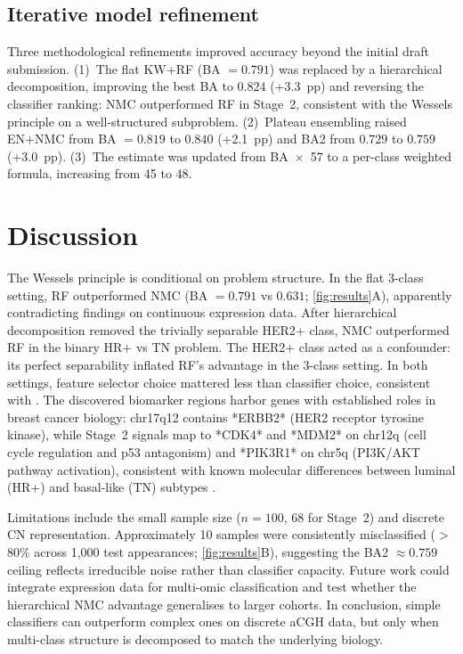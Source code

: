 \documentclass[11pt,a4paper,twocolumn]{article}
\begin{document}
\subsection{Iterative model refinement}
\label{sec:improvements}

Three methodological refinements improved accuracy beyond the initial draft submission. (1)~The flat KW+RF (BA $= 0.791$) was replaced by a hierarchical decomposition, improving the best BA to $0.824$ (+3.3~pp) and reversing the classifier ranking: NMC outperformed RF in Stage~2, consistent with the Wessels principle on a well-structured subproblem. (2)~Plateau ensembling raised EN+NMC from BA $= 0.819$ to $0.840$ (+2.1~pp) and BA2 from $0.729$ to $0.759$ (+3.0~pp). (3)~The estimate was updated from BA~$\times$~57 to a per-class weighted formula, increasing from 45 to 48.

\section{Discussion}
\label{sec:discussion}

The Wessels principle is conditional on problem structure. In the flat 3-class setting, RF outperformed NMC (BA $= 0.791$ vs $0.631$; \autoref{fig:results}A), apparently contradicting findings on continuous expression data. After hierarchical decomposition removed the trivially separable HER2+ class, NMC outperformed RF in the binary HR+ vs TN problem. The HER2+ class acted as a confounder: its perfect separability inflated RF's advantage in the 3-class setting. In both settings, feature selector choice mattered less than classifier choice, consistent with \citet{wessels2005protocol}. The discovered biomarker regions harbor genes with established roles in breast cancer biology: chr17q12 contains *ERBB2* (HER2 receptor tyrosine kinase), while Stage~2 signals map to *CDK4* and *MDM2* on chr12q (cell cycle regulation and p53 antagonism) and *PIK3R1* on chr5q (PI3K/AKT pathway activation), consistent with known molecular differences between luminal (HR+) and basal-like (TN) subtypes \citep{chin2006genomic, sorlie2001gene}.

Limitations include the small sample size ($n = 100$, 68 for Stage~2) and discrete CN representation. Approximately 10 samples were consistently misclassified ($>$80\% across 1,000 test appearances; \autoref{fig:results}B), suggesting the BA2 $\approx 0.759$ ceiling reflects irreducible noise rather than classifier capacity. Future work could integrate expression data for multi-omic classification and test whether the hierarchical NMC advantage generalises to larger cohorts. In conclusion, simple classifiers can outperform complex ones on discrete aCGH data, but only when multi-class structure is decomposed to match the underlying biology.
\end{document}
